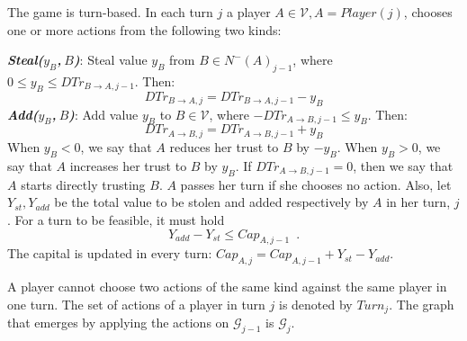 \begin{definition}[Turns]
   The game is turn-based. In each turn $j$ a player $A \in \mathcal{V}, A =
   Player\left(j\right)$, chooses one or more actions from the following two kinds:

   \noindent \textit{\textbf{Steal($y_B$,$\:B$)}}: Steal value $y_B$ from $B \in N^{-}\left(A\right)_{j-1}$, where
   $0 \leq y_B \leq DTr_{B \rightarrow A, j-1}$. Then:
   \begin{equation*}
      DTr_{B \rightarrow A, j} = DTr_{B \rightarrow A, j-1} - y_B
   \end{equation*}
   \noindent \textit{\textbf{Add($y_B$,$\:B$)}}:
   Add value $y_B$ to $B \in \mathcal{V}$, where $-DTr_{A \rightarrow B, j-1} \leq y_B$. Then:
   \begin{equation*}
      DTr_{A \rightarrow B, j} = DTr_{A \rightarrow B, j-1} + y_B
   \end{equation*}
   When $y_B < 0$, we say that $A$ reduces her trust to $B$ by $-y_B$. When $y_B > 0$, we say that $A$ increases her
   trust to $B$ by $y_B$. If $DTr_{A \rightarrow B, j-1} = 0$, then we say that $A$ starts directly trusting $B$.
   $A$ passes her turn if she chooses no action. Also, let $Y_{st}, Y_{add}$ be the
   total value to be stolen and added respectively by $A$ in her turn, $j$. For a turn to be feasible, it must hold
   \begin{equation}
      Y_{add} - Y_{st} \leq Cap_{A, j-1} \enspace.
   \end{equation}
   The capital is updated in every turn: $Cap_{A, j} = Cap_{A, j-1} + Y_{st} - Y_{add}$.

   A player cannot choose two actions of the same kind against the same player in one turn.
   The set of actions of a player in turn $j$ is denoted by $Turn_j$. The graph that emerges by applying
   the actions on $\mathcal{G}_{j-1}$ is $\mathcal{G}_j$.
\end{definition}
